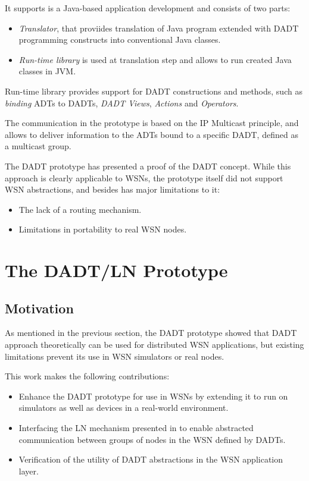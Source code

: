 It supports is a Java-based application development and consists of two parts:
\begin{itemize}
  \item \emph{Translator}, that proviides translation of Java program
  extended with DADT programming constructs into conventional Java classes.
  \item \emph{Run-time library} is used at translation step and allows to run
  created Java classes in  JVM.
\end{itemize}

Run-time library provides support for DADT constructions and methods, such as
\emph{binding} ADTs to DADTs, \emph{DADT Views}, \emph{Actions} and
\emph{Operators}. 

The communication in the prototype is based on the IP Multicast principle, and
allows to deliver information to the ADTs bound to a specific DADT, defined as
a multicast group.

The DADT prototype has presented a proof of the DADT concept. While this
approach is clearly applicable to WSNs, the prototype itself did not support WSN
abstractions, and besides has major limitations to it:

\begin{itemize}
  \item The lack of a routing mechanism.
  \item Limitations in portability to real WSN nodes.
\end{itemize}

\section{The DADT/LN Prototype}

\subsection{Motivation}

As mentioned in the previous section, the DADT prototype
\cite{migliavacca_DADT:2006} showed that DADT approach theoretically can be used
for distributed WSN applications, but existing limitations prevent its use in WSN
simulators or real nodes.

This work makes the following contributions:

\begin{itemize}
  \item Enhance the DADT prototype for use in WSNs by extending it to run
  on simulators as well as devices in a real-world environment.
  \item Interfacing the LN mechanism presented in \cite{mottola_LNAbstraction}
  to enable abstracted communication between groups of nodes in the WSN defined
  by DADTs.
  \item  Verification of the utility of DADT abstractions in the WSN application
  layer.
\end{itemize}

